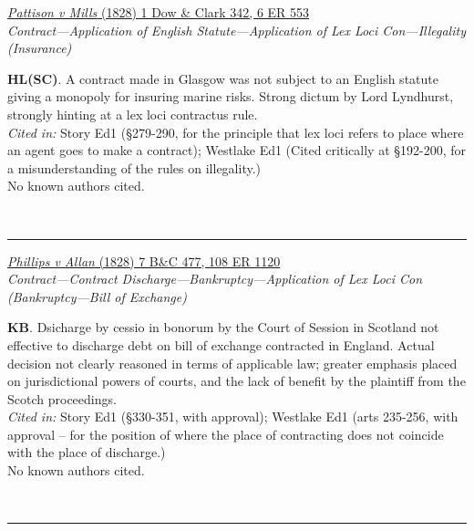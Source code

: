 \documentclass[twoside]{article}
\begin{document}
        \begin{small}
        \begin{center}
        \href{https://heinonline.org/HOL/P?h=hein.engrep/engra0006&i=565}{\textit{Pattison v Mills} (1828) 1 Dow \& Clark 342, 6 ER 553} \label{33} \\ 
\textit{Contract---Application of English Statute---Application of Lex Loci Con---Illegality (Insurance)}\\
        \end{center}
        \textbf{HL(SC)}. A contract made in Glasgow was not subject to an English statute giving a monopoly for insuring marine risks. Strong dictum by Lord Lyndhurst, strongly hinting at a lex loci contractus rule.\\\textit{Cited in: }Story Ed1 (§279-290, for the principle that lex loci refers to place where an agent goes to make a contract); Westlake Ed1 (Cited critically at §192-200, for a misunderstanding of the rules on illegality.)\\No known authors cited.
        \end{small}\\
        \rule{\textwidth}{0.5pt}
        

        \begin{small}
        \begin{center}
        \href{https://heinonline.org/HOL/P?h=hein.engrep/engrf0108&i=1124}{\textit{Phillips v Allan} (1828) 7 B\&C 477, 108 ER 1120} \label{42} \\ 
\textit{Contract---Contract Discharge---Bankruptcy---Application of Lex Loci Con (Bankruptcy---Bill of Exchange)}\\
        \end{center}
        \textbf{KB}. Dsicharge by cessio in bonorum by the Court of Session in Scotland not effective to discharge debt on bill of exchange contracted in England. Actual decision not clearly reasoned in terms of applicable law; greater emphasis placed on jurisdictional powers of courts, and the lack of benefit by the plaintiff from the Scotch proceedings.\\\textit{Cited in: }Story Ed1 (§330-351, with approval); Westlake Ed1 (arts 235-256, with approval – for the position of where the place of contracting does not coincide with the place of discharge.)\\No known authors cited.
        \end{small}\\
        \rule{\textwidth}{0.5pt}
        
\end{document}

